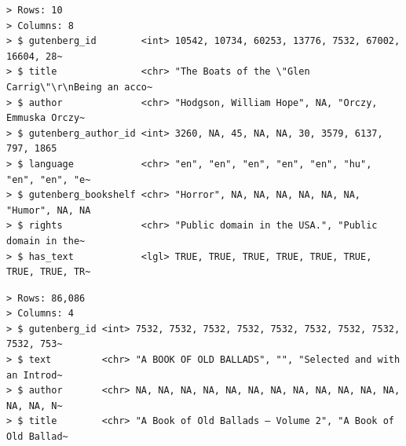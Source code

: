\documentclass[
  letterpaper,
]{latex/krantz}
\newenvironment{Shaded}{\begin{snugshade}}{\end{snugshade}}
\newcommand{\AttributeTok}[1]{\textcolor[rgb]{0.00,0.00,0.00}{#1}}
\newcommand{\CommentTok}[1]{\textcolor[rgb]{0.00,0.00,0.00}{\textit{#1}}}
\newcommand{\FunctionTok}[1]{\textcolor[rgb]{0.00,0.00,0.00}{#1}}
\newcommand{\NormalTok}[1]{\textcolor[rgb]{0.00,0.00,0.00}{#1}}
\newcommand{\OtherTok}[1]{\textcolor[rgb]{0.00,0.00,0.00}{#1}}
\newcommand{\SpecialCharTok}[1]{\textcolor[rgb]{0.00,0.00,0.00}{#1}}
\newcommand{\StringTok}[1]{\textcolor[rgb]{0.00,0.00,0.00}{#1}}
\begin{document}
\begin{verbatim}
> Rows: 10
> Columns: 8
> $ gutenberg_id        <int> 10542, 10734, 60253, 13776, 7532, 67002, 16604, 28~
> $ title               <chr> "The Boats of the \"Glen Carrig\"\r\nBeing an acco~
> $ author              <chr> "Hodgson, William Hope", NA, "Orczy, Emmuska Orczy~
> $ gutenberg_author_id <int> 3260, NA, 45, NA, NA, 30, 3579, 6137, 797, 1865
> $ language            <chr> "en", "en", "en", "en", "en", "hu", "en", "en", "e~
> $ gutenberg_bookshelf <chr> "Horror", NA, NA, NA, NA, NA, NA, "Humor", NA, NA
> $ rights              <chr> "Public domain in the USA.", "Public domain in the~
> $ has_text            <lgl> TRUE, TRUE, TRUE, TRUE, TRUE, TRUE, TRUE, TRUE, TR~
\end{verbatim}

\begin{Shaded}
\end{Shaded}

\begin{Shaded}
\end{Shaded}

\begin{verbatim}
> Rows: 86,086
> Columns: 4
> $ gutenberg_id <int> 7532, 7532, 7532, 7532, 7532, 7532, 7532, 7532, 7532, 753~
> $ text         <chr> "A BOOK OF OLD BALLADS", "", "Selected and with an Introd~
> $ author       <chr> NA, NA, NA, NA, NA, NA, NA, NA, NA, NA, NA, NA, NA, NA, N~
> $ title        <chr> "A Book of Old Ballads — Volume 2", "A Book of Old Ballad~
\end{verbatim}
\end{document}
